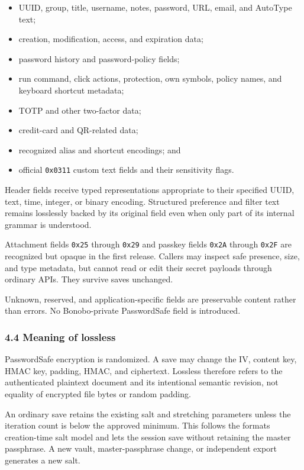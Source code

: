 \documentclass[
  letterpaper,
]{article}
\newcommand{\passthrough}[1]{#1}
\providecommand{\tightlist}{%
  \setlength{\itemsep}{0pt}\setlength{\parskip}{0pt}}
\begin{document}
\begin{itemize}
\tightlist
\item
  UUID, group, title, username, notes, password, URL, email, and AutoType text;
\item
  creation, modification, access, and expiration data;
\item
  password history and password-policy fields;
\item
  run command, click actions, protection, own symbols, policy names, and keyboard shortcut metadata;
\item
  TOTP and other two-factor data;
\item
  credit-card and QR-related data;
\item
  recognized alias and shortcut encodings; and
\item
  official \passthrough{\lstinline!0x0311!} custom text fields and their sensitivity flags.
\end{itemize}

Header fields receive typed representations appropriate to their specified UUID, text, time, integer, or binary
encoding. Structured preference and filter text remains losslessly backed by its original field even when only part of
its internal grammar is understood.

Attachment fields \passthrough{\lstinline!0x25!} through \passthrough{\lstinline!0x29!} and passkey fields
\passthrough{\lstinline!0x2A!} through \passthrough{\lstinline!0x2F!} are recognized but opaque in the first release.
Callers may inspect safe presence, size, and type metadata, but cannot read or edit their secret payloads through
ordinary APIs. They survive saves unchanged.

Unknown, reserved, and application-specific fields are preservable content rather than errors. No Bonobo-private
PasswordSafe field is introduced.

\subsubsection{4.4 Meaning of lossless}\label{44-meaning-of-lossless}

PasswordSafe encryption is randomized. A save may change the IV, content key, HMAC key, padding, HMAC, and ciphertext.
Lossless therefore refers to the authenticated plaintext document and its intentional semantic revision, not equality of
encrypted file bytes or random padding.

An ordinary save retains the existing salt and stretching parameters unless the iteration count is below the approved
minimum. This follows the format\textquotesingle s creation-time salt model and lets the session save without retaining
the master passphrase. A new vault, master-passphrase change, or independent export generates a new salt.
\end{document}
